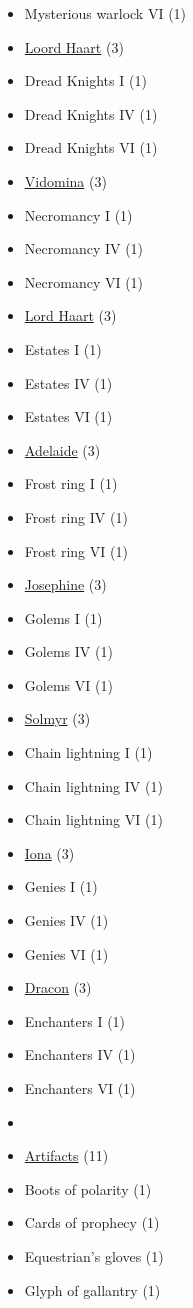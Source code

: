 \begin{multicols}{3}
\begin{itemize}[leftmargin=0pt, label={}, noitemsep, noitemsep]
  \item Mysterious warlock VI (1)
  \item \underline{Loord Haart} (3)
  \item Dread Knights I (1)
  \item Dread Knights IV (1)
  \item Dread Knights VI (1)
  \item \underline{Vidomina} (3)
  \item Necromancy I (1)
  \item Necromancy IV (1)
  \item Necromancy VI (1)
  \item \underline{Lord Haart} (3)
  \item Estates I (1)
  \item Estates IV (1)
  \item Estates VI (1)
  \item \underline{Adelaide} (3)
  \item Frost ring I (1)
  \item Frost ring IV (1)
  \item Frost ring VI (1)
  \item \underline{Josephine} (3)
  \item Golems I (1)
  \item Golems IV (1)
  \item Golems VI (1)
  \item \underline{Solmyr} (3)
  \item Chain lightning I (1)
  \item Chain lightning IV (1)
  \item Chain lightning VI (1)
  \item \underline{Iona} (3)
  \item Genies I (1)
  \item Genies IV (1)
  \item Genies VI (1)
  \item \underline{Dracon} (3)
  \item Enchanters I (1)
  \item Enchanters IV (1)
  \item Enchanters VI (1)
  \item
  \item \underline{Artifacts} (11)
  \item Boots of polarity (1)
  \item Cards of prophecy (1)
  \item Equestrian's gloves (1)
  \item Glyph of gallantry (1)

\end{itemize}
\end{multicols}
